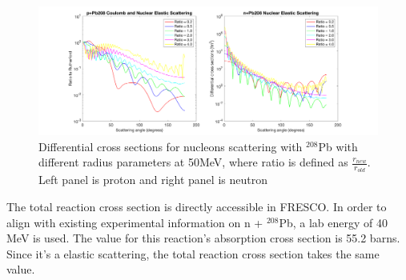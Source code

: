 \documentclass[12pt]{article}
\begin{document}
	
	\begin{figure}[t]
	\centering
	\includegraphics[width=1.0\textwidth]{7.png}
	\caption{Differential cross sections for nucleons scattering with $^{208}$Pb with different radius parameters at 50MeV, where ratio is defined as $\frac{r_{new}}{r_{old}}$. Left panel is proton and right panel is neutron  }
	\label{fig:radiusparameter}
	\end{figure}
	
	The total reaction cross section is directly accessible in FRESCO. In order to align with existing experimental information on n + $^{208}$Pb, a lab energy of 40 MeV is used. The value for this reaction's absorption cross section is 55.2 barns. Since it's a elastic scattering, the total reaction cross section takes the same value.
	
\FloatBarrier



\end{document}
